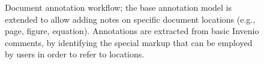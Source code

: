 \begin{figure}[!ht]
  \centering
  \caption[Document annotation workflow]
          {Document annotation workflow; the base annotation model is extended
           to allow adding notes on specific document locations (e.g., page,
           figure, equation). Annotations are extracted from basic Invenio
           comments, by identifying the special markup that can be employed by
           users in order to refer to locations.}
  \label{fig:docanno}
\end{figure}

